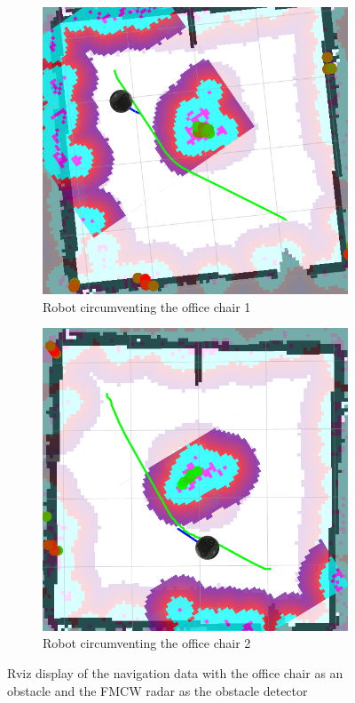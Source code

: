 \begin{figure}[ht!]
  \centering
  \begin{subfigure}[t]{0.49\linewidth}
    \includegraphics[width=\linewidth]{imgs/chapter5/rvizwchairradar1.png}
     \caption{Robot circumventing the office chair 1}
     \label{fig::rvizwchairradar1}
  \end{subfigure}
  \begin{subfigure}[t]{0.47\linewidth}
    \includegraphics[width=\linewidth]{imgs/chapter5/rvizwchairradar2.png}
    \caption{Robot circumventing the office chair 2}
    \label{fig::rvizwchairradar2}
  \end{subfigure}
  \caption{Rviz display of the navigation data with the office chair as an obstacle and the  \ac{FMCW} \ac{radar} as the obstacle detector}
  \label{fig::rvizwchairradar}
\end{figure}
